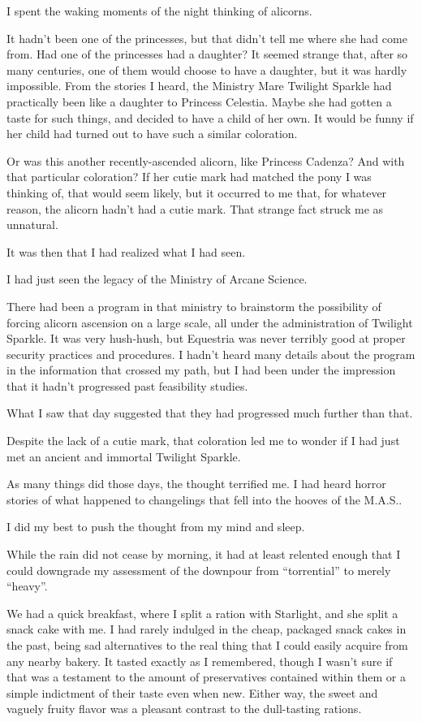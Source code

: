 {\br}%
I spent the waking moments of the night thinking of alicorns.

It hadn’t been one of the princesses, but that didn’t tell me where she had come from. Had one of the princesses had a daughter? It seemed strange that, after so many centuries, one of them would choose to have a daughter, but it was hardly impossible. From the stories I heard, the Ministry Mare Twilight Sparkle had practically been like a daughter to Princess Celestia. Maybe she had gotten a taste for such things, and decided to have a child of her own. It would be funny if her child had turned out to have such a similar coloration.

Or was this another recently-ascended alicorn, like Princess Cadenza? And with that particular coloration? If her cutie mark had matched the pony I was thinking of, that would seem likely, but it occurred to me that, for whatever reason, the alicorn hadn’t had a cutie mark. That strange fact struck me as unnatural.

It was then that I had realized what I had seen.

I had just seen the legacy of the Ministry of Arcane Science.

There had been a program in that ministry to brainstorm the possibility of forcing alicorn ascension on a large scale, all under the administration of Twilight Sparkle. It was very hush-hush, but Equestria was never terribly good at proper security practices and procedures. I hadn’t heard many details about the program in the information that crossed my path, but I had been under the impression that it hadn’t progressed past feasibility studies.

What I saw that day suggested that they had progressed much further than that.

Despite the lack of a cutie mark, that coloration led me to wonder if I had just met an ancient and immortal Twilight Sparkle.

As many things did those days, the thought terrified me. I had heard horror stories of what happened to changelings that fell into the hooves of the M.A.S..

I did my best to push the thought from my mind and sleep.

{\br}%
While the rain did not cease by morning, it had at least relented enough that I could downgrade my assessment of the downpour from “torrential” to merely “heavy”.

We had a quick breakfast, where I split a ration with Starlight, and she split a snack cake with me. I had rarely indulged in the cheap, packaged snack cakes in the past, being sad alternatives to the real thing that I could easily acquire from any nearby bakery. It tasted exactly as I remembered, though I wasn’t sure if that was a testament to the amount of preservatives contained within them or a simple indictment of their taste even when new. Either way, the sweet and vaguely fruity flavor was a pleasant contrast to the dull-tasting rations.

